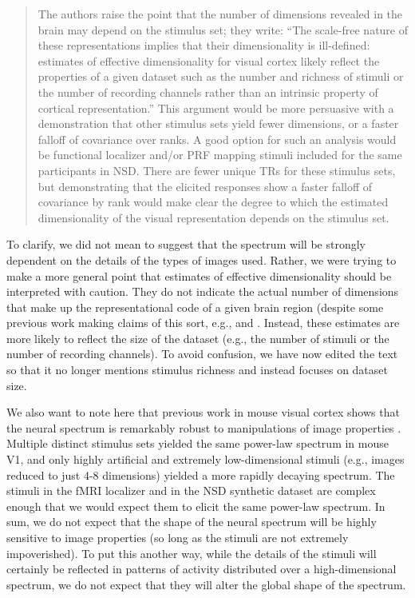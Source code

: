 \documentclass[10pt]{article}
\begin{document}
\begin{quote}
The authors raise the point that the number of dimensions revealed in the brain may depend on the stimulus set; they write: ``The scale-free nature of these representations implies that their dimensionality is ill-defined: estimates of effective dimensionality for visual cortex likely reflect the properties of a given dataset such as the number and richness of stimuli or the number of recording channels rather than an intrinsic property of cortical representation.'' This argument would be more persuasive with a demonstration that other stimulus sets yield fewer dimensions, or a faster falloff of covariance over ranks. A good option for such an analysis would be functional localizer and/or PRF mapping stimuli included for the same participants in NSD. There are fewer unique TRs for these stimulus sets, but demonstrating that the elicited responses show a faster falloff of covariance by rank would make clear the degree to which the estimated dimensionality of the visual representation depends on the stimulus set.
\end{quote}

To clarify, we did not mean to suggest that the spectrum will be strongly dependent on the details of the types of images used. Rather, we were trying to make a more general point that estimates of effective dimensionality should be interpreted with caution. They do not indicate the actual number of dimensions that make up the representational code of a given brain region (despite some previous work making claims of this sort, e.g., \textcite{Lehky2014} and \textcite{Lehky2016}. Instead, these estimates are more likely to reflect the size of the dataset (e.g., the number of stimuli or the number of recording channels). To avoid confusion, we have now edited the text so that it no longer mentions stimulus richness and instead focuses on dataset size.

We also want to note here that previous work in mouse visual cortex shows that the neural spectrum is remarkably robust to manipulations of image properties \autocite{Stringer2019}. Multiple distinct stimulus sets yielded the same power-law spectrum in mouse V1, and only highly artificial and extremely low-dimensional stimuli (e.g., images reduced to just 4-8 dimensions) yielded a more rapidly decaying spectrum. The stimuli in the fMRI localizer and in the NSD synthetic dataset are complex enough that we would expect them to elicit the same power-law spectrum. In sum, we do not expect that the shape of the neural spectrum will be highly sensitive to image properties (so long as the stimuli are not extremely impoverished). To put this another way, while the details of the stimuli will certainly be reflected in patterns of activity distributed over a high-dimensional spectrum, we do not expect that they will alter the global shape of the spectrum.
\end{document}
